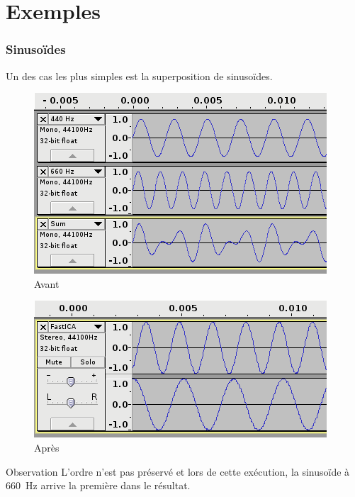 \documentclass[compress]{beamer}
\begin{document}
\section{Exemples}
\begin{frame}
	\frametitle{Sinusoïdes}
	Un des cas les plus simples est la superposition de sinusoïdes.
	\vfill

	\begin{minipage}[b]{.35\textwidth}
	\begin{figure}[h]
	\includegraphics[width=\textwidth]{sine.png}
	\caption{Avant}
	\end{figure}
	\end{minipage}
	\hfill
	\begin{minipage}[b]{.35\textwidth}
	\begin{figure}[h]
	\includegraphics[width=\textwidth]{sine_d.png}
	\caption{Après}
	\end{figure}
	\end{minipage}

	\begin{block}{Observation}
	L'ordre n'est pas préservé et lors de cette exécution,
	la sinusoïde à 660~Hz arrive la première dans le résultat.
	\end{block}
\end{frame}
\end{document}

